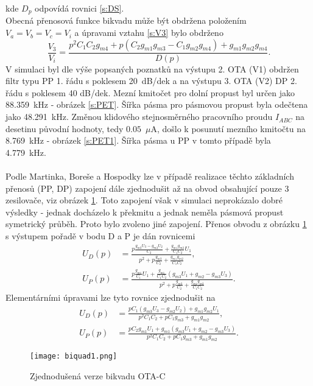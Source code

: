 kde $D_p$ odpovídá rovnici \ref{s:DS}.\\
Obecná přenosová funkce bikvadu může být obdržena položením $V_a = V_b = V_c = V_i$ a úpravami vztahu \ref{s:V3} bylo obdrženo
\begin{equation}
\frac{V_3}{V_i} = \frac{p^2C_1C_2g_{m4} + p(C_2g_{m1}g_{m3} - C_1g_{m2}g_{m4}) + g_{m1}g_{m2}g_{m4}}{D(p)}.
\end{equation}
\noindent 
V simulaci byl dle výše popsaných poznatků na výstupu 2. OTA (V1) obdržen filtr typu PP 1. řádu s poklesem 20~dB/dek a na výstupu 3. OTA (V2) DP 2. řádu s poklesem 40 dB/dek. Mezní kmitočet pro dolní propust byl určen jako 88.359~kHz - obrázek \ref{s:PET}. Šířka pásma pro pásmovou propust byla odečtena jako 48.291~kHz. Změnou klidového stejnosměrného pracovního proudu $I_{ABC}$ na desetinu původní hodnoty, tedy $0.05$~$\mu$A, došlo k posunutí mezního kmitočtu na 8.769~kHz - obrázek \ref{s:PET1}. Šířka pásma u PP v tomto případě byla 4.779~kHz.\\
\\
\noindent Podle Martinka, Boreše a Hospodky \cite{10} lze v případě realizace těchto základních přenosů (PP, DP) zapojení dále zjednodušit až na obvod obsahující pouze 3 zesilovače, viz obrázek \ref{s:BIK2}. Toto zapojení však v simulaci neprokázalo dobré výsledky - jednak docházelo k překmitu a jednak neměla pásmová propust symetrický průběh. Proto bylo zvoleno jiné zapojení. Přenos obvodu z obrázku \ref{s:BIK2} s výstupem pořadě v bodu D a P je dán rovnicemi
\begin{align}
U_D(p) &= \frac{p\frac{g_{m3}U_3-g_{m2}U_2}{C_2}+\frac{g_{m1}g_{m2}}{C_1C_2}U_1}{p^2 + p\frac{g_{m3}}{C_2} + \frac{g_{m1}g_{m2}}{C_1C_2}},\\
U_P(p) &= \frac{p\frac{g_{m1}}{C_1}U_1 + \frac{g_{m1}}{C_1C_2}(g_{m3}U_1+g_{m2}-g_{m3}U_3)}{p^2 + p\frac{g_{m3}}{C_2} + \frac{g_{m1}g_{m2}}{C_1C_2}}.
\end{align}
\noindent Elementárními úpravami lze tyto rovnice zjednodušit na
\begin{align}
U_D(p) &= \frac{pC_1(g_{m3}U_3 - g_{m2}U_2) + g_{m1}g_{m2}U_1}{p^2C_1C_2 + pC_1g_{m3} + g_{m1}g_{m2}},\\
U_P(p) &= \frac{pC_2g_{m1}U_1 + g_{m1}(g_{m3}U_1 + g_{m2} - g_{m3}U_3)}{p^2C_1C_2 + pC_1g_{m3} + g_{m1}g_{m2}}.
\end{align}
\begin{figure}[h]
\centering
\texttt{[image: biquad1.png]}
\caption[Zjednodušená verze bikvadu OTA-C]{Zjednodušená verze bikvadu OTA-C \label{s:BIK2}}
\end{figure}
